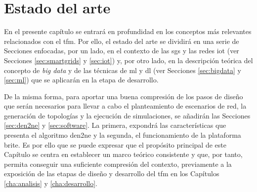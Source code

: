 \chapter{Estado del arte}
\label{estadoArte}

En el presente capítulo se entrará en profundidad en los conceptos más relevantes relacionados con el \gls{tfm}. Por ello, el estado del arte se dividirá en una serie de Secciones enfocadas, por un lado, en el contexto de las \gls{sg}s y las redes \acrshort{iot} (ver Secciones \ref{sec:smartgrids} y \ref{sec:iot}) y, por otro lado, en la descripción teórica del concepto de \textit{big data} y de las técnicas de \gls{ml} y \gls{dl} (ver Secciones \ref{sec:bigdata} y \ref{sec:ml}) que se aplicarán en la etapa de desarrollo. 

\vspace{3mm}

De la misma forma, para aportar una buena compresión de los pasos de diseño que serán necesarios para llevar a cabo el planteamiento de escenarios de red, la generación de topologías y la ejecución de simulaciones, se añadirán las Secciones \ref{sec:den2ne} y \ref{sec:software}. La primera, expondrá las características que presenta el algoritmo \acrshort{den2ne} y la segunda, el funcionamiento de la plataforma \acrshort{brite}. Es por ello que se puede expresar que el propósito principal de este Capítulo se centra en establecer un marco teórico consistente y que, por tanto, permita conseguir una suficiente compresión del contexto, previamente a la exposición de las etapas de diseño y desarrollo del \gls{tfm} en los Capítulos \ref{cha:analisis} y \ref{cha:desarrollo}.

\vspace{3mm}















